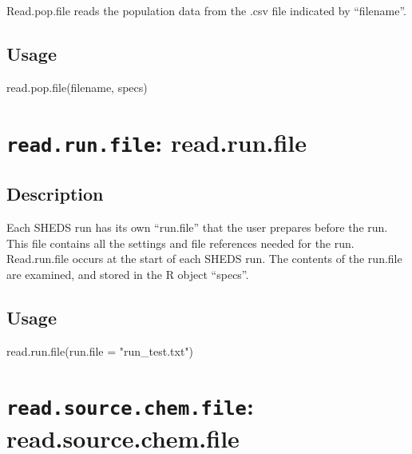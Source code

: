 \documentclass[
]{article}
\newenvironment{Shaded}{\begin{snugshade}}{\end{snugshade}}
\newcommand{\AttributeTok}[1]{\textcolor[rgb]{0.77,0.63,0.00}{#1}}
\newcommand{\FunctionTok}[1]{\textcolor[rgb]{0.00,0.00,0.00}{#1}}
\newcommand{\NormalTok}[1]{#1}
\newcommand{\StringTok}[1]{\textcolor[rgb]{0.31,0.60,0.02}{#1}}
\begin{document}
Read.pop.file reads the population data from the .csv file indicated by
``filename''.

\hypertarget{usage-42}{%
\subsection{Usage}\label{usage-42}}

\begin{Shaded}
\begin{Highlighting}[]
\FunctionTok{read.pop.file}\NormalTok{(filename, specs)}
\end{Highlighting}
\end{Shaded}

\hypertarget{read.run.file-read.run.file}{%
\section{\texorpdfstring{\texttt{read.run.file}:
read.run.file}{read.run.file: read.run.file}}\label{read.run.file-read.run.file}}

\hypertarget{description-43}{%
\subsection{Description}\label{description-43}}

Each SHEDS run has its own ``run.file'' that the user prepares before
the run. This file contains all the settings and file references needed
for the run. Read.run.file occurs at the start of each SHEDS run. The
contents of the run.file are examined, and stored in the R object
``specs''.

\hypertarget{usage-43}{%
\subsection{Usage}\label{usage-43}}

\begin{Shaded}
\begin{Highlighting}[]
\FunctionTok{read.run.file}\NormalTok{(}\AttributeTok{run.file =} \StringTok{"run\_test.txt"}\NormalTok{)}
\end{Highlighting}
\end{Shaded}

\hypertarget{read.source.chem.file-read.source.chem.file}{%
\section{\texorpdfstring{\texttt{read.source.chem.file}:
read.source.chem.file}{read.source.chem.file: read.source.chem.file}}\label{read.source.chem.file-read.source.chem.file}}
\end{document}
